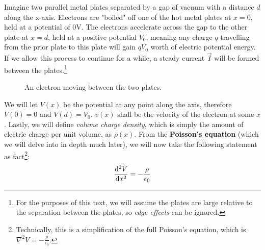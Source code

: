 Imagine two parallel metal plates separated by a gap of vacuum with a distance \(d\) along the x-axis. Electrons are "boiled" off one of the hot metal plates at \(x=0\), held at a potential of \(0\si{\volt}\). The electrons accelerate across the gap to the other plate at \(x=d\), held at a positive potential \(V_0\), meaning any charge \(q\) travelling from the prior plate to this plate will gain \(qV_0\) worth of electric potential energy. If we allow this process to continue for a while, a steady current \(\vec{I}\) will be formed between the plates.\footnote{For the purposes of this text, we will assume the plates are large relative to the separation between the plates, so \emph{edge effects} can be ignored.} 
\begin{figure}[H]
  \centering
  \caption{An electron moving between the two plates.}
\end{figure}


We will let \(V(x)\) be the potential at any point along the axis, therefore \(V(0)=0\) and \(V(d)=V_0\). \(v(x)\) shall be the velocity of the electron at some \(x\). Lastly, we will define \emph{volume charge density}, which is simply the amount of electric charge per unit volume, as \(\rho(x)\). From the \textbf{Poisson's equation} (which we will delve into in depth much later), we will now take the following statement as fact\footnote{Technically, this is a simplification of the full Poisson's equation, which is \(\nabla^2 V=-\frac{\rho}{\epsilon_0}\).}:
\begin{equation}
  \odv[2]{V}{x} = -\frac{\rho}{\epsilon_0}
\end{equation}


